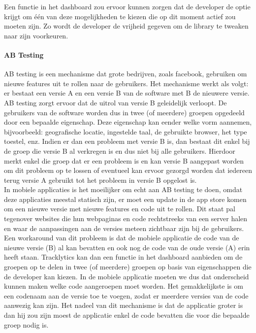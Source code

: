 Een functie in het dashboard zou ervoor kunnen zorgen dat de developer de optie krijgt om \'e\'en van deze mogelijkheden te kiezen die op dit moment actief zou moeten zijn. Zo wordt de developer de vrijheid gegeven om de library te tweaken naar zijn voorkeuren.

\paragraph{AB Testing}
AB testing is een mechanisme dat grote bedrijven, zoals facebook, gebruiken om nieuwe features uit te rollen naar de gebruikers. Het mechanisme werkt als volgt: er bestaat een versie A en een versie B van de software met B de nieuwere versie. AB testing zorgt ervoor dat de uitrol van versie B geleidelijk verloopt. De gebruikers van de software worden dus in twee (of meerdere) groepen opgedeeld door een bepaalde eigenschap. Deze eigenschap kan eender welke vorm aannemen, bijvoorbeeld: geografische locatie, ingestelde taal, de gebruikte browser, het type toestel, enz. Indien er dan een probleem met versie B is, dan bestaat dit enkel bij de groep die versie B al verkregen is en dus niet bij alle gebruikers. Hierdoor merkt enkel die groep dat er een probleem is en kan versie B aangepast worden om dit probleem op te lossen of eventueel kan ervoor gezorgd worden dat iedereen terug versie A gebruikt tot het probleem in versie B opgelost is. \\

In mobiele applicaties is het moeilijker om echt aan AB testing te doen, omdat deze applicaties meestal statisch zijn, er moet een update in de app store komen om een nieuwe versie met nieuwe features en code uit te rollen. Dit staat pal tegenover websites die hun webpaginas en code rechtstreeks van een server halen en waar de aanpassingen aan de versies meteen zichtbaar zijn bij de gebruikers. 
Een workaround van dit probleem is dat de mobiele applicatie de code van de nieuwe versie (B) al kan bevatten en ook nog de code van de oude versie (A) erin heeft staan. Tracklytics kan dan een functie in het dashboard aanbieden om de groepen op te delen in twee (of meerdere) groepen op basis van eigenschappen die de developer kan kiezen. In de mobiele applicatie moeten we dus dat onderscheid kunnen maken welke code aangeroepen moet worden. Het gemakkelijkste is om een codenaam aan de versie toe te voegen, zodat er meerdere versies van de code aanwezig kan zijn. 
Het nadeel van dit mechanisme is dat de applicatie groter is dan hij zou zijn moest de applicatie enkel de code bevatten die voor die bepaalde groep nodig is.



